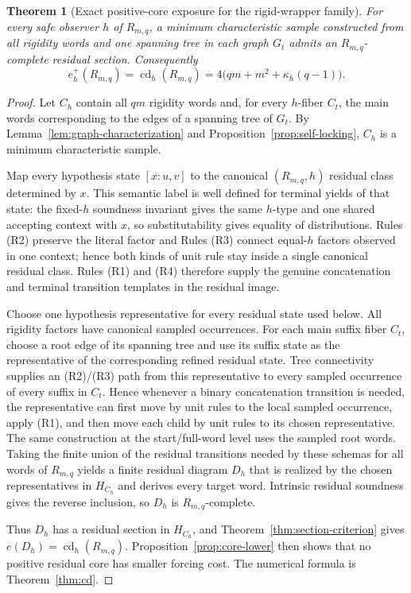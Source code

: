 \documentclass[11pt]{article}
\newtheorem{theorem}[definition]{Theorem}
\newcommand{\cd}{\operatorname{cd}}
\begin{document}
\begin{theorem}[Exact positive-core exposure for the rigid-wrapper family]
\label{thm:family-core-equality}
For every safe observer $h$ of $R_{m,q}$, a minimum characteristic sample
constructed from all rigidity words and one spanning tree in each graph
$G_t$ admits an $R_{m,q}$-complete residual section.  Consequently
\[
 \boxed{
 e_h^+(R_{m,q})
 =\cd_h(R_{m,q})
 =4\bigl(qm+m^2+\kappa_h(q-1)\bigr).
 }
\]
\end{theorem}

\begin{proof}
Let $C_h$ contain all $qm$ rigidity words and, for every $h$-fiber $C_t$, the
main words corresponding to the edges of a spanning tree of $G_t$.  By
Lemma~\ref{lem:graph-characterization} and
Proposition~\ref{prop:self-locking}, $C_h$ is a minimum characteristic sample.

Map every hypothesis state $[x:u,v]$ to the canonical $(R_{m,q},h)$ residual
class determined by $x$.  This semantic label is well defined for terminal
yields of that state: the fixed-$h$ soundness invariant gives the same
$h$-type and one shared accepting context with $x$, so substitutability gives
equality of distributions.  Rules (R2) preserve the literal factor and Rules
(R3) connect equal-$h$ factors observed in one context; hence both kinds of
unit rule stay inside a single canonical residual class.  Rules (R1) and (R4)
therefore supply the genuine concatenation and terminal transition templates
in the residual image.

Choose one hypothesis representative for every residual state used below.
All rigidity factors have canonical sampled occurrences.  For each main
suffix fiber $C_t$, choose a root edge of its spanning tree and use its suffix
state as the representative of the corresponding refined residual state.
Tree connectivity supplies an (R2)/(R3) path from this representative to every
sampled occurrence of every suffix in $C_t$.  Hence whenever a binary
concatenation transition is needed, the representative can first move by unit
rules to the local sampled occurrence, apply (R1), and then move each child by
unit rules to its chosen representative.  The same construction at the
start/full-word level uses the sampled root words.  Taking the finite union of
the residual transitions needed by these schemas for all words of
$R_{m,q}$ yields a finite residual diagram $D_h$ that is realized by the
chosen representatives in $H_{C_h}$ and derives every target word.  Intrinsic
residual soundness gives the reverse inclusion, so $D_h$ is
$R_{m,q}$-complete.

Thus $D_h$ has a residual section in $H_{C_h}$, and
Theorem~\ref{thm:section-criterion} gives
$e(D_h)=\cd_h(R_{m,q})$.  Proposition~\ref{prop:core-lower} then shows that
no positive residual core has smaller forcing cost.  The numerical formula is
Theorem~\ref{thm:cd}.
\end{proof}
\end{document}
